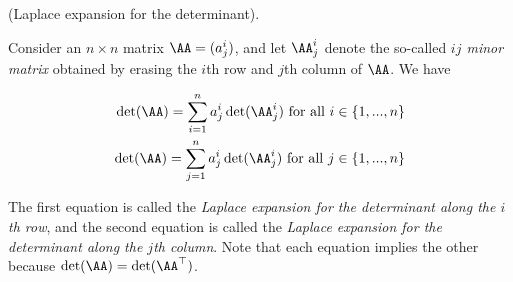 \begin{theorem}
    (Laplace expansion for the determinant).
    
    Consider an $n \times n$ matrix $\AA = (a^i_j)$, and let $\AA^i_j$ denote the so-called \textit{$ij$ minor matrix} obtained by erasing the $i$th row and $j$th column of $\AA$. We have
    
    \begin{align*}
        \det(\AA) = \sum_{i = 1}^{n} a^i_j \det(\AA^i_j) \text{ for all $i \in \{1, ..., n\}$} \\
        \det(\AA) = \sum_{j = 1}^{n} a^i_j \det(\AA^i_j) \text{ for all $j \in \{1, ..., n\}$}
    \end{align*}
    
    The first equation is called the \textit{Laplace expansion for the determinant along the $i$th row}, and the second equation is called the \textit{Laplace expansion for the determinant along the $j$th column}. Note that each equation implies the other because $\det(\AA) = \det(\AA^\top)$.
\end{theorem}
    
